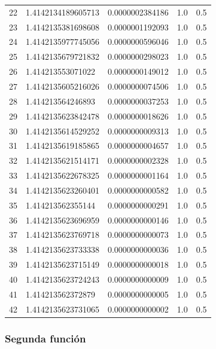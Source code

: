 \documentclass[titlepage,a4paper]{article}
\begin{document}
\begin{center}
\begin{tabular}{| c | l | c | c | c |}
22      & 1.4142134189605713  &  0.0000002384186  &  1.0  &  0.5 \\
23      & 1.4142135381698608  &  0.0000001192093  &  1.0  &  0.5 \\
24      & 1.4142135977745056  &  0.0000000596046  &  1.0  &  0.5 \\
25      & 1.4142135679721832  &  0.0000000298023  &  1.0  &  0.5 \\
26      & 1.414213553071022  &  0.0000000149012  &  1.0  &  0.5 \\
27      & 1.4142135605216026  &  0.0000000074506  &  1.0  &  0.5 \\
28      & 1.414213564246893  &  0.0000000037253  &  1.0  &  0.5 \\
29      & 1.4142135623842478  &  0.0000000018626  &  1.0  &  0.5 \\
30      & 1.4142135614529252  &  0.0000000009313  &  1.0  &  0.5 \\
31      & 1.4142135619185865  &  0.0000000004657  &  1.0  &  0.5 \\
32      & 1.4142135621514171  &  0.0000000002328  &  1.0  &  0.5 \\
33      & 1.4142135622678325  &  0.0000000001164  &  1.0  &  0.5 \\
34      & 1.4142135623260401  &  0.0000000000582  &  1.0  &  0.5 \\
35      & 1.414213562355144  &  0.0000000000291  &  1.0  &  0.5 \\
36      & 1.4142135623696959  &  0.0000000000146  &  1.0  &  0.5 \\
37      & 1.4142135623769718  &  0.0000000000073  &  1.0  &  0.5 \\
38      & 1.4142135623733338  &  0.0000000000036  &  1.0  &  0.5 \\
39      & 1.4142135623715149  &  0.0000000000018  &  1.0  &  0.5 \\
40      & 1.4142135623724243  &  0.0000000000009  &  1.0  &  0.5 \\
41      & 1.414213562372879  &  0.0000000000005  &  1.0  &  0.5 \\
42      & 1.4142135623731065  &  0.0000000000002  &  1.0  &  0.5 \\

\hline
\end{tabular}
\end{center}
\clearpage


\subsubsection{Segunda función}\label{sec:bis2}
\end{document}

